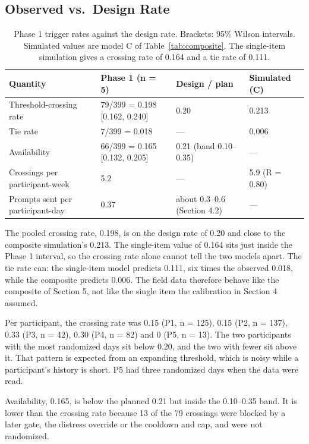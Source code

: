 \documentclass[11pt,letterpaper]{article}
\begin{document}
\subsection{Observed vs.\ Design Rate}

\begin{table}[htbp]
\centering
\small
\begin{tabular}{@{}p{4.2cm}p{4.4cm}p{3.3cm}p{2.2cm}@{}}
\toprule
\textbf{Quantity} & \textbf{Phase 1 (n = 5)} & \textbf{Design / plan} & \textbf{Simulated (C)} \\
\midrule
Threshold-crossing rate & 79/399 = 0.198 [0.162, 0.240] & 0.20 & 0.213 \\
Tie rate & 7/399 = 0.018 & --- & 0.006 \\
Availability & 66/399 = 0.165 [0.132, 0.205] & 0.21 (band 0.10--0.35) & --- \\
Crossings per participant-week & 5.2 & --- & 5.9 (R = 0.80) \\
Prompts sent per participant-day & 0.37 & about 0.3--0.6 (Section 4.2) & --- \\
\bottomrule
\end{tabular}
\caption{Phase 1 trigger rates against the design rate. Brackets: 95\% Wilson intervals. Simulated values are model C of Table~\ref{tab:composite}. The single-item simulation gives a crossing rate of 0.164 and a tie rate of 0.111.}
\label{tab:field}
\end{table}

The pooled crossing rate, 0.198, is on the design rate of 0.20 and close to the composite simulation's 0.213. The single-item value of 0.164 sits just inside the Phase 1 interval, so the crossing rate alone cannot tell the two models apart. The tie rate can: the single-item model predicts 0.111, six times the observed 0.018, while the composite predicts 0.006. The field data therefore behave like the composite of Section 5, not like the single item the calibration in Section 4 assumed.

Per participant, the crossing rate was 0.15 (P1, n = 125), 0.15 (P2, n = 137), 0.33 (P3, n = 42), 0.30 (P4, n = 82) and 0 (P5, n = 13). The two participants with the most randomized days sit below 0.20, and the two with fewer sit above it. That pattern is expected from an expanding threshold, which is noisy while a participant's history is short. P5 had three randomized days when the data were read.

Availability, 0.165, is below the planned 0.21 but inside the 0.10--0.35 band. It is lower than the crossing rate because 13 of the 79 crossings were blocked by a later gate, the distress override or the cooldown and cap, and were not randomized.
\end{document}
